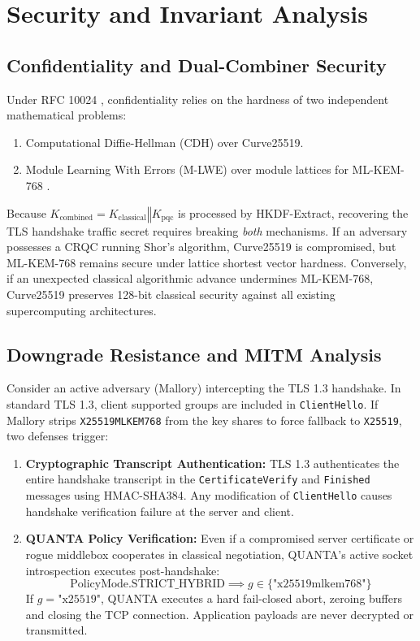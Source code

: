 \documentclass[conference]{IEEEtran}
\begin{document}
\section{Security and Invariant Analysis}

\subsection{Confidentiality and Dual-Combiner Security}
Under RFC 10024 \cite{rfc10024}, confidentiality relies on the hardness of two independent mathematical problems:
\begin{enumerate}
    \item Computational Diffie-Hellman (CDH) over Curve25519.
    \item Module Learning With Errors (M-LWE) over module lattices for ML-KEM-768 \cite{nist_fips203, bos2018crystals}.
\end{enumerate}
Because $K_{\text{combined}} = K_{\text{classical}} \mathbin{\Vert} K_{\text{pqc}}$ is processed by HKDF-Extract, recovering the TLS handshake traffic secret requires breaking \textit{both} mechanisms. If an adversary possesses a CRQC running Shor's algorithm, Curve25519 is compromised, but ML-KEM-768 remains secure under lattice shortest vector hardness. Conversely, if an unexpected classical algorithmic advance undermines ML-KEM-768, Curve25519 preserves 128-bit classical security against all existing supercomputing architectures.

\subsection{Downgrade Resistance and MITM Analysis}
Consider an active adversary (Mallory) intercepting the TLS 1.3 handshake. In standard TLS 1.3, client supported groups are included in \texttt{ClientHello}.
If Mallory strips \texttt{X25519MLKEM768} from the key shares to force fallback to \texttt{X25519}, two defenses trigger:
\begin{enumerate}
    \item \textbf{Cryptographic Transcript Authentication:} TLS 1.3 authenticates the entire handshake transcript in the \texttt{CertificateVerify} and \texttt{Finished} messages using HMAC-SHA384. Any modification of \texttt{ClientHello} causes handshake verification failure at the server and client.
    \item \textbf{QUANTA Policy Verification:} Even if a compromised server certificate or rogue middlebox cooperates in classical negotiation, QUANTA's active socket introspection executes post-handshake:
    \begin{equation}
        \text{PolicyMode.STRICT\_HYBRID} \implies g \in \{\text{"x25519mlkem768"}\}
    \end{equation}
    If $g = \text{"x25519"}$, QUANTA executes a hard fail-closed abort, zeroing buffers and closing the TCP connection. Application payloads are never decrypted or transmitted.
\end{enumerate}
\end{document}
